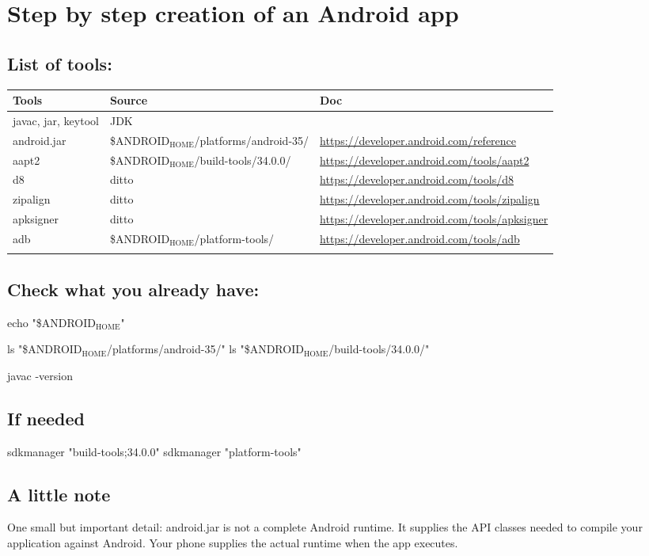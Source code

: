 \documentclass[11pt]{article}
\author{Arnab Chakraborty}
\date{\today}
\title{}
\begin{document}
\tableofcontents

\section{Step by step creation of an Android app}
\label{sec:org30812e2}

\subsection{List of tools:}
\label{sec:org5979edc}
\begin{center}
\begin{tabular}{lll}
Tools & Source & Doc\\
\hline
javac, jar, keytool & JDK & \\
android.jar & \$ANDROID\(_{\text{HOME}}\)/platforms/android-35/ & \url{https://developer.android.com/reference}\\
aapt2 & \$ANDROID\(_{\text{HOME}}\)/build-tools/34.0.0/ & \url{https://developer.android.com/tools/aapt2}\\
d8 & ditto & \url{https://developer.android.com/tools/d8}\\
zipalign & ditto & \url{https://developer.android.com/tools/zipalign}\\
apksigner & ditto & \url{https://developer.android.com/tools/apksigner}\\
adb & \$ANDROID\(_{\text{HOME}}\)/platform-tools/ & \url{https://developer.android.com/tools/adb}\\
 &  & \\
\end{tabular}
\end{center}


\subsection{Check what you already have:}
\label{sec:orgaf3f036}
echo "\$ANDROID\(_{\text{HOME}}\)"

ls "\$ANDROID\(_{\text{HOME}}\)/platforms/android-35/"
ls "\$ANDROID\(_{\text{HOME}}\)/build-tools/34.0.0/"

javac -version

\subsection{If needed}
\label{sec:orgc38eb1f}
sdkmanager "build-tools;34.0.0"
sdkmanager "platform-tools"

\subsection{A little note}
\label{sec:org6391ec8}
One small but important detail: android.jar is not a complete
Android runtime. It supplies the API classes needed to compile
your application against Android. Your phone supplies the actual
runtime when the app executes. 
\end{document}
